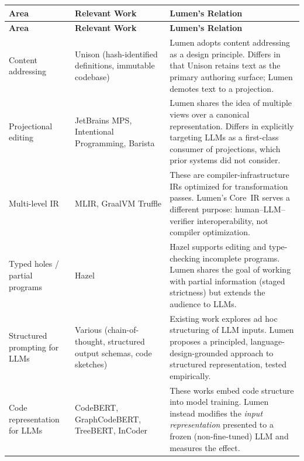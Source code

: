 \documentclass[11pt]{article}
\begin{document}
\begin{longtable}{@{}p{3.5cm}p{4.5cm}p{4.5cm}@{}}
  \toprule
  \textbf{Area} & \textbf{Relevant Work} &
    \textbf{Lumen's Relation} \\
  \midrule
  \endfirsthead
  \toprule
  \textbf{Area} & \textbf{Relevant Work} &
    \textbf{Lumen's Relation} \\
  \midrule
  \endhead

  Content addressing &
    Unison (hash-identified definitions, immutable codebase) &
    Lumen adopts content addressing as a design principle.
    Differs in that Unison retains text as the primary authoring
    surface; Lumen demotes text to a projection. \\
  \addlinespace

  Projectional editing &
    JetBrains MPS, Intentional Programming, Barista &
    Lumen shares the idea of multiple views over a canonical
    representation.  Differs in explicitly targeting LLMs as a
    first-class consumer of projections, which prior systems
    did not consider. \\
  \addlinespace

  Multi-level IR &
    MLIR, GraalVM Truffle &
    These are compiler-infrastructure IRs optimized for
    transformation passes.  Lumen's Core~IR serves a different
    purpose: human--LLM--verifier interoperability, not compiler
    optimization. \\
  \addlinespace

  Typed holes / partial programs &
    Hazel &
    Hazel supports editing and type-checking incomplete programs.
    Lumen shares the goal of working with partial information
    (staged strictness) but extends the audience to LLMs. \\
  \addlinespace

  Structured prompting for LLMs &
    Various (chain-of-thought, structured output schemas, code
    sketches) &
    Existing work explores ad hoc structuring of LLM inputs.
    Lumen proposes a principled, language-design-grounded approach
    to structured representation, tested empirically. \\
  \addlinespace

  Code representation for LLMs &
    CodeBERT, GraphCodeBERT, TreeBERT, InCoder &
    These works embed code structure into model training.
    Lumen instead modifies the \emph{input representation}
    presented to a frozen (non-fine-tuned) LLM and measures the
    effect. \\
  \bottomrule
\end{longtable}
\end{document}
